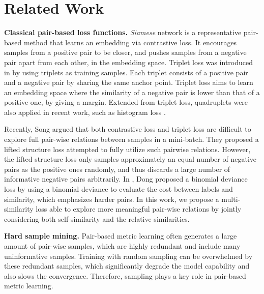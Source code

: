 \documentclass[10pt,twocolumn,letterpaper]{article}
\begin{document}
\section{Related Work}


{\textbf{Classical pair-based loss functions.}} {\it Siamese} network \cite{contrastive} is a representative pair-based method that learns an embedding via contrastive loss. It encourages samples from a positive pair to be closer, and pushes samples from a negative pair apart from each other, in the embedding space.
Triplet loss was introduced in \cite{Hoffer2015DeepML} by using triplets as training samples. Each triplet consists of a positive pair and a negative pair by sharing the same anchor point. Triplet loss aims to learn an embedding space where the similarity of a negative pair is lower than that of a positive one, by giving a margin. Extended from triplet loss, quadruplets were also applied in recent work, such as histogram loss \cite{histogram}.

Recently, Song \etal \cite{lifted-structured-loss}  argued that both contrastive loss and triplet loss are difficult to explore full pair-wise relations between samples in a mini-batch. They proposed a lifted structure loss attempted to fully utilize such pairwise relations. However, the lifted structure loss only samples approximately an equal number of negative pairs as the positive ones randomly, and thus discards a large number of informative negative pairs arbitrarily. In \cite{binomial}, Dong \etal  proposed a binomial deviance loss by using a binomial deviance to evaluate the cost between labels and similarity, which emphasizes harder pairs. In this work, we propose a multi-similarity loss able to explore more meaningful pair-wise relations by jointly considering both self-similarity and the relative similarities. 

{\textbf{Hard sample mining.}} Pair-based metric learning often generates a large amount of pair-wise samples, which are highly redundant and include many uninformative samples. Training with random sampling can be overwhelmed by these redundant samples, which significantly degrade the model capability and also slows the convergence. Therefore, sampling plays a key role in pair-based metric learning.
\end{document}
